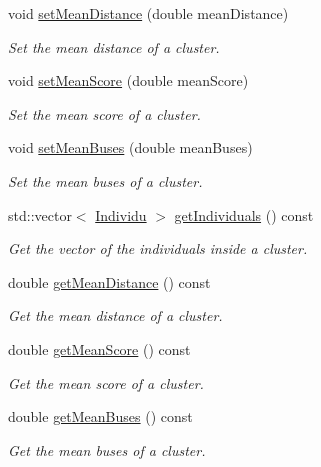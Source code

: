 \begin{DoxyCompactItemize}
void \hyperlink{class_cluster_a42924ba44dffd0b688d811e547873e85}{set\+Mean\+Distance} (double mean\+Distance)
\begin{DoxyCompactList}\small\item\em Set the mean distance of a cluster. \end{DoxyCompactList}\item 
void \hyperlink{class_cluster_a6b34e5d03bb27757547ac442f1b79288}{set\+Mean\+Score} (double mean\+Score)
\begin{DoxyCompactList}\small\item\em Set the mean score of a cluster. \end{DoxyCompactList}\item 
void \hyperlink{class_cluster_a78748b29ae0d126a6228fb1e25128653}{set\+Mean\+Buses} (double mean\+Buses)
\begin{DoxyCompactList}\small\item\em Set the mean buses of a cluster. \end{DoxyCompactList}\item 
std\+::vector$<$ \hyperlink{class_individu}{Individu} $>$ \hyperlink{class_cluster_aeb50bef802b2ad60fa622184fd902644}{get\+Individuals} () const
\begin{DoxyCompactList}\small\item\em Get the vector of the individuals inside a cluster. \end{DoxyCompactList}\item 
double \hyperlink{class_cluster_adfc60f4505a0e78dc7a376bfafa0f352}{get\+Mean\+Distance} () const
\begin{DoxyCompactList}\small\item\em Get the mean distance of a cluster. \end{DoxyCompactList}\item 
double \hyperlink{class_cluster_af070716a9f6d89b07bfbdcffa3546d23}{get\+Mean\+Score} () const
\begin{DoxyCompactList}\small\item\em Get the mean score of a cluster. \end{DoxyCompactList}\item 
double \hyperlink{class_cluster_a09609cb787d9f70321a1a8681bd775ad}{get\+Mean\+Buses} () const
\begin{DoxyCompactList}\small\item\em Get the mean buses of a cluster. \end{DoxyCompactList}\end{DoxyCompactItemize}
